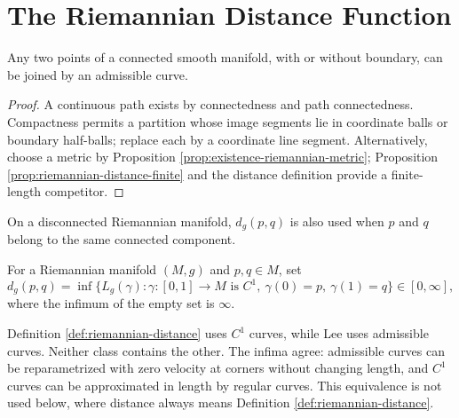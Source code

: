 \section{The Riemannian Distance Function}

\begin{proposition}
\label{prop:connected-manifold-admissible-curve}





Any two points of a connected smooth manifold, with or without boundary, can be joined by an admissible curve.
\end{proposition}
\begin{proof}

\sketch A continuous path exists by connectedness and path connectedness. Compactness permits a partition whose image segments lie in coordinate balls or boundary half-balls; replace each by a coordinate line segment. Alternatively, choose a metric by Proposition \ref{prop:existence-riemannian-metric}; Proposition \ref{prop:riemannian-distance-finite} and the distance definition provide a finite-length competitor.
\end{proof}

On a disconnected Riemannian manifold, $d_g(p,q)$ is also used when $p$ and $q$ belong to the same connected component.

\begin{definition}
\label{def:riemannian-distance}




For a Riemannian manifold $(M,g)$ and $p,q\in M$, set
\[
d_g(p,q)=\inf\{L_g(\gamma):\gamma:[0,1]\to M\text{ is }C^1,\ \gamma(0)=p,\ \gamma(1)=q\}\in[0,\infty],
\]
where the infimum of the empty set is $\infty$.
\end{definition}

\begin{remark}
\label{rem:riemannian-distance-c1-vs-admissible}

Definition \ref{def:riemannian-distance} uses $C^1$ curves, while Lee uses admissible curves. Neither class contains the other. The infima agree: admissible curves can be reparametrized with zero velocity at corners without changing length, and $C^1$ curves can be approximated in length by regular curves. This equivalence is not used below, where distance always means Definition \ref{def:riemannian-distance}.
\end{remark}

